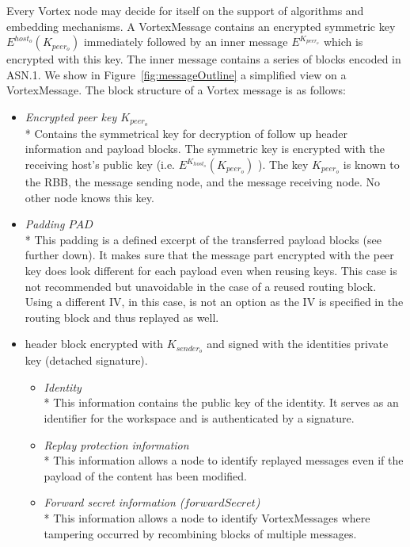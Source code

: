 \documentclass[10pt,journal,compsoc,twocolumn,twoside]{IEEEtran}
\begin{document}

Every Vortex node may decide for itself on the support of algorithms and embedding mechanisms. A VortexMessage contains an encrypted symmetric key $E^{host_o}\left(K_{peer_o}\right)$ immediately followed by an inner message $E^{K_{peer_o}}$ which is encrypted with this key. The inner message contains a series of blocks encoded in ASN.1. We show in Figure~\ref{fig:messageOutline} a simplified view on a VortexMessage. The block structure of a Vortex message is as follows:
\begin{itemize}
	\item \emph{Encrypted peer key $K_{peer_o}$}\\*
	Contains the symmetrical key for decryption of follow up header information and payload blocks. The symmetric key is encrypted with the receiving host's public key (i.e. $E^{K_{host_o}}\left(K_{peer_o}\right)$ ). The key $K_{peer_o}$ is known to the RBB, the message sending node, and the message receiving node. No other node knows this key.
	\item \emph{Padding $PAD$}\\*
	This padding is a defined excerpt of the transferred payload blocks (see further down). It makes sure that the message part encrypted with the peer key does look different for each payload even when reusing keys. This case is not recommended but unavoidable in the case of a reused routing block. Using a different IV, in this case, is not an option as the IV is specified in the routing block and thus replayed as well.
	\item header block encrypted with $K_{sender_o}$ and signed with the identities private key (detached signature).
	\begin{itemize}
		\item \emph{Identity}\\*
		This information contains the public key of the identity. It serves as an identifier for the workspace and is authenticated by a signature.
		\item \emph{Replay protection information}\\*
		This information allows a node to identify replayed messages even if the payload of the content has been modified.
		\item \emph{Forward secret information ($forwardSecret$)}\\*
		This information allows a node to identify VortexMessages where tampering occurred by recombining blocks of multiple messages.      

\end{itemize}
\end{itemize}
\end{document}

